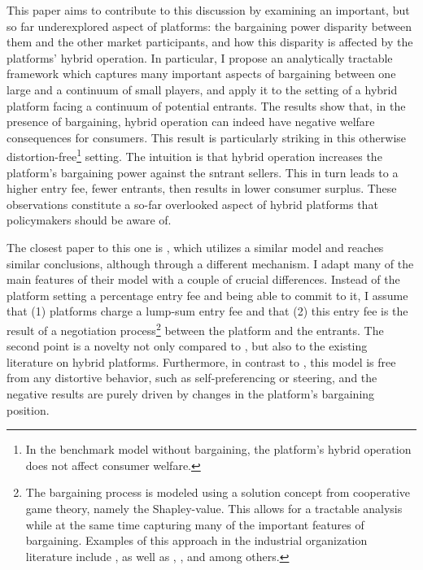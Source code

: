 \documentclass[a4paper]{article}
\begin{document}
This paper aims to contribute to this discussion by examining an important, but so far underexplored aspect of platforms: the bargaining power disparity between them and the other market participants, and how this disparity is affected by the platforms' hybrid operation.
In particular, I propose an analytically tractable framework which captures many important aspects of bargaining between one large and a continuum of small players, and apply it to the setting of a hybrid platform facing a continuum of potential entrants.
The results show that, in the presence of bargaining, hybrid operation can indeed have negative welfare consequences for consumers.
This result is particularly striking in this otherwise distortion-free\footnote{
    In the benchmark model without bargaining, the platform's hybrid operation does not affect consumer welfare.
} setting. 
The intuition is that hybrid operation increases the platform's bargaining power against the sntrant sellers.
This in turn leads to a higher entry fee, fewer entrants, then results in lower consumer surplus.
These observations constitute a so-far overlooked aspect of hybrid platforms that policymakers should be aware of.

The closest paper to this one is \textcite{anderson2021hybrid}, which utilizes a similar model and reaches similar conclusions, although through a different mechanism.
I adapt many of the main features of their model with a couple of crucial differences.
Instead of the platform setting a percentage entry fee and being able to commit to it, I assume that (1) platforms charge a lump-sum entry fee and that (2) this entry fee is the result of a negotiation process\footnote{
    The bargaining process is modeled using a solution concept from cooperative game theory, namely the Shapley-value.
    This allows for a tractable analysis while at the same time capturing many of the important features of bargaining.
    Examples of this approach in the industrial organization literature include \textcite{montez2007downstream}, as well as \textcite{hart1990property}, \textcite{levy1997individual}, \textcite{inderst2003bargaining} and \textcite{brugemann2019intra} among others.
}
between the platform and the entrants.
The second point is a novelty not only compared to \textcite{anderson2021hybrid}, but also to the existing literature on hybrid platforms.
Furthermore, in contrast to \textcite{hagiu2022should}, this model is free from any distortive behavior, such as self-preferencing or steering, and the negative results are purely driven by changes in the platform's bargaining position.
\end{document}
